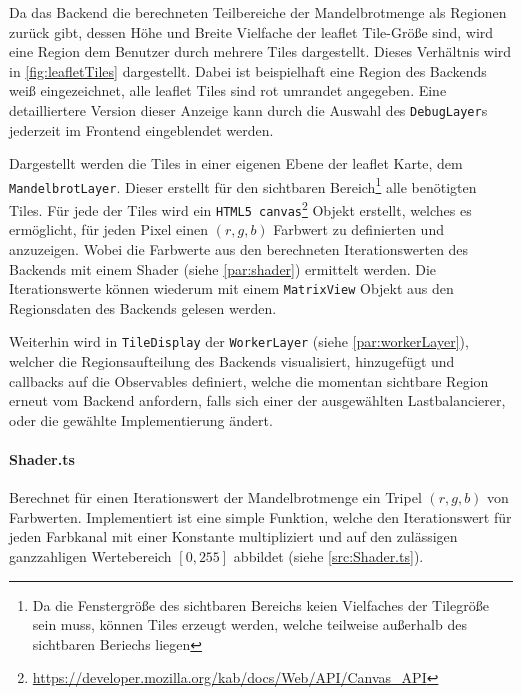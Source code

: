 Da das Backend die berechneten Teilbereiche der Mandelbrotmenge als Regionen zurück gibt, dessen Höhe und Breite
Vielfache der leaflet Tile-Größe sind, wird eine Region dem Benutzer durch mehrere Tiles dargestellt.
Dieses Verhältnis wird in \autoref{fig:leafletTiles} dargestellt. Dabei ist beispielhaft eine Region des Backends
weiß eingezeichnet, alle leaflet Tiles sind rot umrandet angegeben. Eine detailliertere Version dieser Anzeige kann
durch die Auswahl des \verb|DebugLayer|s jederzeit im Frontend eingeblendet werden.

Dargestellt werden die Tiles in einer eigenen Ebene der leaflet Karte, dem \verb|MandelbrotLayer|.
Dieser erstellt für den sichtbaren Bereich\footnote{Da die Fenstergröße des sichtbaren Bereichs keien Vielfaches der Tilegröße sein muss, können Tiles erzeugt werden, welche teilweise außerhalb des sichtbaren Beriechs liegen}
alle benötigten Tiles. Für jede der Tiles wird ein \verb|HTML5 canvas|\footnote{\url{https://developer.mozilla.org/kab/docs/Web/API/Canvas_API}} Objekt erstellt, welches es
ermöglicht, für jeden Pixel einen \( (r,g,b) \) Farbwert zu definierten und anzuzeigen. Wobei die Farbwerte aus den berechneten
Iterationswerten des Backends mit einem Shader (siehe \autoref{par:shader}) ermittelt werden. Die Iterationswerte können wiederum
mit einem \verb|MatrixView| Objekt aus den Regionsdaten des Backends gelesen werden.

Weiterhin wird in \verb|TileDisplay| der \verb|WorkerLayer| (siehe \autoref{par:workerLayer}), welcher die Regionsaufteilung des Backends visualisiert,  hinzugefügt und callbacks auf die Observables definiert, welche die momentan sichtbare Region
erneut vom Backend anfordern, falls sich einer der ausgewählten Lastbalancierer, oder die gewählte Implementierung ändert.

\paragraph{Shader.ts}\label{par:shader}
Berechnet für einen Iterationswert der Mandelbrotmenge ein Tripel \( (r,g,b) \) von Farbwerten.
Implementiert ist eine simple Funktion, welche den Iterationswert für jeden Farbkanal mit einer Konstante multipliziert
und auf den zulässigen ganzzahligen Wertebereich \( [0,255] \) abbildet (siehe \autoref{src:Shader.ts}).

\begin{figure}[h!]
	
\end{figure}

